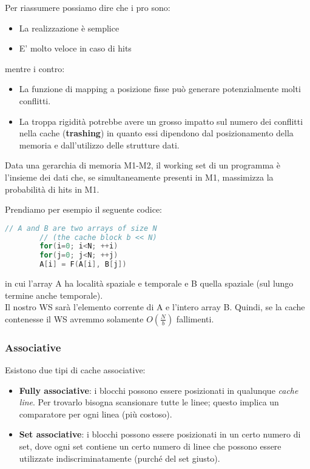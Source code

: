 \noindent Per riassumere possiamo dire che i pro sono:
\begin{itemize}
	\item La realizzazione è semplice
	\item E' molto veloce in caso di hits
\end{itemize}
mentre i contro:
\begin{itemize}
	\item La funzione di mapping a posizione fisse può generare potenzialmente molti conflitti.
	\item La troppa rigidità potrebbe avere un grosso impatto sul numero dei conflitti nella cache (\textbf{trashing}) in quanto essi dipendono dal posizionamento della memoria e dall'utilizzo delle strutture dati.
\end{itemize}

\begin{definition}
	Data una gerarchia di memoria M1-M2, il working set di un programma è l'insieme dei dati che, se simultaneamente presenti in M1, massimizza la probabilità di hits in M1.
\end{definition}

\begin{example}
	Prendiamo per esempio il seguente codice:
	\begin{lstlisting}[language=C]
		// A and B are two arrays of size N
		// (the cache block b << N)
		for(i=0; i<N; ++i)
		for(j=0; j<N; ++j)
		A[i] = F(A[i], B[j])
	\end{lstlisting}
	in cui l'array A ha località spaziale e temporale e B quella spaziale (sul lungo termine anche temporale).\\
	Il nostro WS sarà l'elemento corrente di A e l'intero array B. Quindi, se la cache contenesse il WS avremmo solamente $O(\frac{N}{b})$ fallimenti.
\end{example}

\subsubsection{Associative}
Esistono due tipi di cache associative:
\begin{itemize}
	\item \textbf{Fully associative}: i blocchi possono essere posizionati in qualunque \emph{cache line}. Per trovarlo bisogna scansionare tutte le linee; questo implica un comparatore per ogni linea (più costoso).
	\item \textbf{Set associative}: i blocchi possono essere posizionati in un certo numero di set, dove ogni set contiene un certo numero di linee che possono essere utilizzate indiscriminatamente (purché del set giusto).
\end{itemize}

